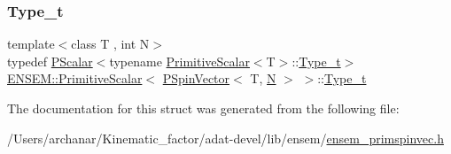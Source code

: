 \mbox{\label{structENSEM_1_1PrimitiveScalar_3_01PSpinVector_3_01T_00_01N_01_4_01_4_ae74b3341c6408b55d594cc603d4ee470}} 
\subsubsection{\texorpdfstring{Type\_t}{Type\_t}\hspace{0.1cm}{\footnotesize\ttfamily [3/3]}}
{\footnotesize\ttfamily template$<$class T , int N$>$ \\
typedef \mbox{\hyperlink{classENSEM_1_1PScalar}{P\+Scalar}}$<$typename \mbox{\hyperlink{structENSEM_1_1PrimitiveScalar}{Primitive\+Scalar}}$<$T$>$\+::\mbox{\hyperlink{structENSEM_1_1PrimitiveScalar_3_01PSpinVector_3_01T_00_01N_01_4_01_4_ae74b3341c6408b55d594cc603d4ee470}{Type\+\_\+t}}$>$ \mbox{\hyperlink{structENSEM_1_1PrimitiveScalar}{E\+N\+S\+E\+M\+::\+Primitive\+Scalar}}$<$ \mbox{\hyperlink{classENSEM_1_1PSpinVector}{P\+Spin\+Vector}}$<$ T, \mbox{\hyperlink{adat__devel_2lib_2hadron_2operator__name__util_8cc_a7722c8ecbb62d99aee7ce68b1752f337}{N}} $>$ $>$\+::\mbox{\hyperlink{structENSEM_1_1PrimitiveScalar_3_01PSpinVector_3_01T_00_01N_01_4_01_4_ae74b3341c6408b55d594cc603d4ee470}{Type\+\_\+t}}}



The documentation for this struct was generated from the following file\+:\begin{DoxyCompactItemize}
\item 
/\+Users/archanar/\+Kinematic\+\_\+factor/adat-\/devel/lib/ensem/\mbox{\hyperlink{adat-devel_2lib_2ensem_2ensem__primspinvec_8h}{ensem\+\_\+primspinvec.\+h}}\end{DoxyCompactItemize}
